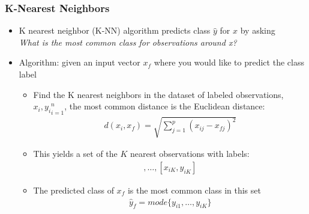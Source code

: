 \documentclass[
  shownotes,
  xcolor={svgnames},
  hyperref={colorlinks,citecolor=DarkBlue,linkcolor=DarkRed,urlcolor=DarkBlue}
  , aspectratio=169]{beamer}
\begin{document}
\begin{frame}[fragile]
\frametitle{K-Nearest Neighbors}

\begin{itemize}
\item K nearest neighbor (K-NN) algorithm predicts class $\hat y$ for $x$ by asking \\
{\it What is the most common class for observations around x?}
\item Algorithm: given an input vector $x_f$ where you would like to predict the class label

\begin{itemize}
  \item Find the K nearest neighbors in the dataset of labeled observations, ${x_i,y_i}_{i=1}^n$, the most common distance is the Euclidean distance:
  \begin{align}
  d(x_i,x_f)=\sqrt{\sum_{j=1}^p(x_{ij}-x_{fj})^2}
  \end{align}
  \item This yields a set of the $K$ nearest observations with labels: 
  \begin{align}
  [x_{i1},y_{i1}],\dots,[x_{iK},y_{iK}]
  \end{align}
  \item The predicted class of $x_f$ is the most common class in this set
  \begin{align}
  \hat{y}_f =mode\{y_{i1},\dots,y_{iK}\}
  \end{align}
\end{itemize}

\end{itemize}
\end{frame}
\end{document}
